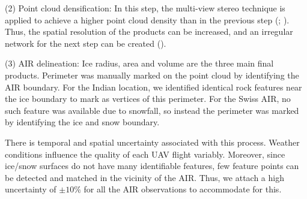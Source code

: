 \documentclass[utf8]{frontiersSCNS} %
\begin{document}
(2) Point cloud densification: In this step, the multi-view stereo technique is applied to achieve a higher point
cloud density than in the previous step (\cite{Furukawa_2010}; \cite{Molg_2017}). Thus, the spatial resolution of
the products can be increased, and an irregular network for the next step can be created (\cite{Kung_2011}).

(3) AIR delineation: Ice radius, area and volume are the three main final products. Perimeter was manually marked
on the point cloud by identifying the AIR boundary. For the Indian location, we identified identical rock features
near the ice boundary to mark as vertices of this perimeter. For the Swiss AIR, no such feature was available due
to snowfall, so instead the perimeter was marked by identifying the ice and snow boundary. 

There is temporal and spatial uncertainty associated with this process. Weather conditions influence the quality of each
UAV flight variably. Moreover, since ice/snow surfaces do not have many identifiable features, few feature points can
be detected and matched in the vicinity of the AIR. Thus, we attach a high uncertainty of $\pm 10 \%$ for all the AIR
observations to accommodate for this.
\end{document}
